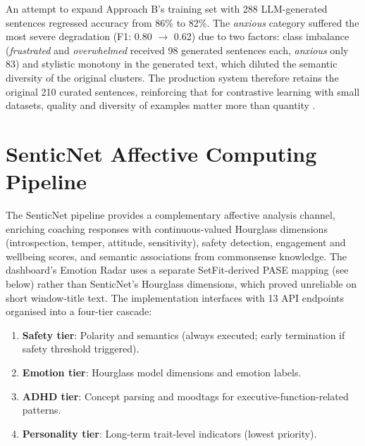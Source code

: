 An attempt to expand Approach B's training set with 288 LLM-generated sentences regressed accuracy from 86\% to 82\%. The \emph{anxious} category suffered the most severe degradation (F1: 0.80 $\rightarrow$ 0.62) due to two factors: class imbalance (\emph{frustrated} and \emph{overwhelmed} received 98 generated sentences each, \emph{anxious} only 83) and stylistic monotony in the generated text, which diluted the semantic diversity of the original clusters. The production system therefore retains the original 210 curated sentences, reinforcing that for contrastive learning with small datasets, quality and diversity of examples matter more than quantity \cite{reimers2019}.

\section{SenticNet Affective Computing Pipeline}
\label{sec:senticnet-pipeline}

The SenticNet pipeline \cite{cambria2024, cambria2016} provides a complementary affective analysis channel, enriching coaching responses with continuous-valued Hourglass dimensions (introspection, temper, attitude, sensitivity), safety detection, engagement and wellbeing scores, and semantic associations from commonsense knowledge. The dashboard's Emotion Radar uses a separate SetFit-derived PASE mapping (see below) rather than SenticNet's Hourglass dimensions, which proved unreliable on short window-title text. The implementation interfaces with 13 API endpoints organised into a four-tier cascade:

\begin{enumerate}[nosep]
  \item \textbf{Safety tier}: Polarity and semantics (always executed; early termination if safety threshold triggered).
  \item \textbf{Emotion tier}: Hourglass model dimensions and emotion labels.
  \item \textbf{ADHD tier}: Concept parsing and moodtags for executive-function-related patterns.
  \item \textbf{Personality tier}: Long-term trait-level indicators (lowest priority).
\end{enumerate}

